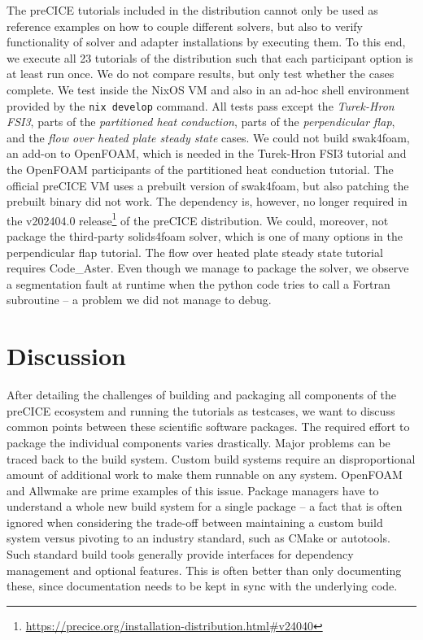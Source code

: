\documentclass{eceasst}
\begin{document}
The preCICE tutorials included in the distribution cannot only be used as reference examples on how to couple different solvers, but also to verify functionality of solver and adapter installations by executing them.
To this end, we execute all 23 tutorials of the distribution such that each participant option is at least run once. We do not compare results, but only test whether the cases complete.
We test inside the NixOS VM and also in an ad-hoc shell environment provided by the \texttt{nix develop} command. All tests pass except the \textit{Turek-Hron FSI3}, parts of the \textit{partitioned heat conduction}, parts of the \textit{perpendicular flap}, and the \textit{flow over heated plate steady state} cases.
We could not build swak4foam, an add-on to OpenFOAM, which is needed in the Turek-Hron FSI3 tutorial and the OpenFOAM participants of the partitioned heat conduction tutorial.
The official preCICE VM uses a prebuilt version of swak4foam, but also patching the prebuilt binary did not work.
The dependency is, however, no longer required in the v202404.0 release\footnote{\url{https://precice.org/installation-distribution.html\#v24040}} of the preCICE distribution.
We could, moreover, not package the third-party solids4foam solver, which is one of many options in the perpendicular flap tutorial.
The flow over heated plate steady state tutorial requires Code\_Aster. Even though we manage to package the solver, we observe a segmentation fault at runtime when the python code tries to call a Fortran subroutine -- a problem we did not manage to debug.


\section{Discussion}
\label{sec:discussion}

After detailing the challenges of building and packaging all components of the preCICE ecosystem and running the tutorials as testcases, we want to discuss common points between these scientific software packages.
The required effort to package the individual components varies drastically. Major problems can be traced back to the build system.
Custom build systems require an disproportional amount of additional work to make them runnable on any system.
OpenFOAM and Allwmake are prime examples of this issue. Package managers have to understand a whole new build system for a single package -- a fact that is often ignored when considering the trade-off between maintaining a custom build system versus pivoting to an industry standard, such as CMake or autotools.
Such standard build tools generally provide interfaces for dependency management and optional features. This is often better than only documenting these, since documentation needs to be kept in sync with the underlying code.
\end{document}
